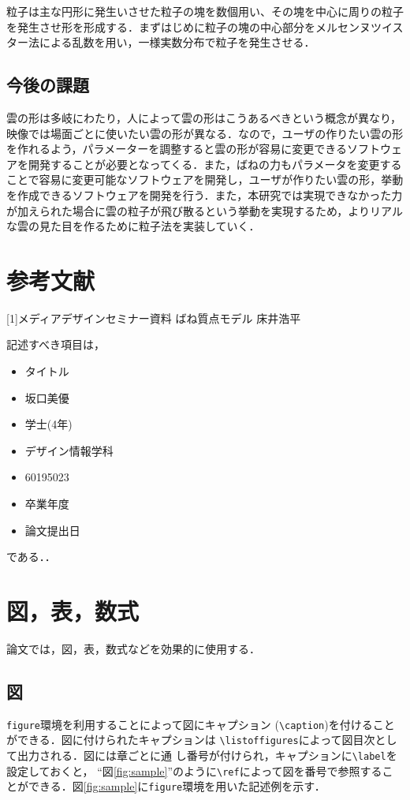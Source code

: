\documentclass[11pt]{jreport}
\begin{document}
粒子は主な円形に発生いさせた粒子の塊を数個用い、その塊を中心に周りの粒子を発生させ形を形成する．まずはじめに粒子の塊の中心部分をメルセンヌツイスター法による乱数を用い，一様実数分布で粒子を発生させる．


\section{今後の課題}
雲の形は多岐にわたり，人によって雲の形はこうあるべきという概念が異なり，映像では場面ごとに使いたい雲の形が異なる．なので，ユーザの作りたい雲の形を作れるよう，パラメーターを調整すると雲の形が容易に変更できるソフトウェアを開発することが必要となってくる．また，ばねの力もパラメータを変更することで容易に変更可能なソフトウェアを開発し，ユーザが作りたい雲の形，挙動を作成できるソフトウェアを開発を行う．また，本研究では実現できなかった力が加えられた場合に雲の粒子が飛び散るという挙動を実現するため，よりリアルな雲の見た目を作るために粒子法を実装していく．


\chapter{参考文献}
[1]メディアデザインセミナー資料 ばね質点モデル 床井浩平

記述すべき項目は，
\begin{itemize}
  \item タイトル
  \item 坂口美優
  \item 学士(4年)
  \item デザイン情報学科
  \item 60195023
  \item 卒業年度
  \item 論文提出日
\end{itemize}
である．．


\chapter{図，表，数式}\label{chap:fig-tab-exp}

論文では，図，表，数式などを効果的に使用する．

\section{図}

{\tt figure}環境を利用することによって図にキャプション
(\verb|\caption|)を付けることができる．図に付けられたキャプションは
\verb|\listoffigures|によって図目次として出力される．図には章ごとに通
し番号が付けられ，キャプションに\verb|\label|を設定しておくと，
``図\ref{fig:sample}''のように\verb|\ref|によって図を番号で参照するこ
とができる．図\ref{fig:sample}に{\tt figure}環境を用いた記述例を示す．
\end{document}
